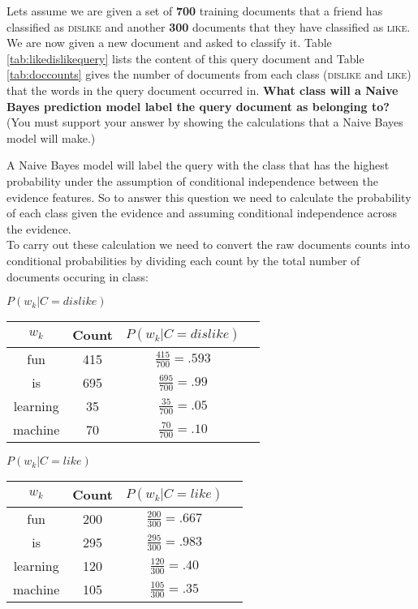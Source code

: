\documentclass[--SOLUTION-OPTION--]{ditpaper}
\begin{document}
\question Lets assume we are given a set of \textbf{700} training documents that a friend has classified as \textsc{dislike} and another \textbf{300} documents that they have classified as \textsc{like}. We are now given a new  document and asked to classify it. Table \ref{tab:likedislikequery} lists the content of this query document and Table \ref{tab:doccounts} gives the number of documents from each class (\textsc{dislike} and \textsc{like}) that the words in the query document occurred in. \textbf{What class will a \textbf{Naive Bayes} prediction model label the query document as belonging to?} (You must support your answer by showing the calculations that a Naive Bayes model will make.)
		\begin{answer}
			A Naive Bayes model will label the query with the class that has the highest probability under the assumption of conditional independence between the evidence features. So to answer this question we need to calculate the probability of each class given the evidence and assuming conditional independence across the evidence.\\
			To carry out these calculation we need to convert the raw documents counts into conditional probabilities by dividing each count by the total number of documents occuring in class:
\begin{center}
								\textbf{$P(w_k|C=dislike)$}
								\begin{tabular}{|c|c|c|c|}
								\hline
											$w_k$ & Count & $P(w_k | C=dislike)$\\
												\hline
								 fun & 415 & $\frac{415}{700} = .593$\\
								 			is & 695 & $\frac{695}{700} = .99$\\
											learning & 35 & $\frac{35}{700} = .05$\\
											machine & 70 & $\frac{70}{700} = .10$\\
								\hline
								\end{tabular}
\end{center}
\begin{center}
								\textbf{$P(w_k|C=like)$}										
								\begin{tabular}{|c|c|c|c|}
								\hline
								$w_k$ & Count & $P(w_k | C=like)$\\
												\hline
								 fun & 200 & $\frac{200}{300} = .667$\\
								 is & 295 & $\frac{295}{300} = .983$\\
								learning & 120 & $\frac{120}{300} = .40$\\
								machine & 105 & $\frac{105}{300} = .35$\\
								\hline
								\end{tabular}
\end{center}


\end{answer}
\end{document}
